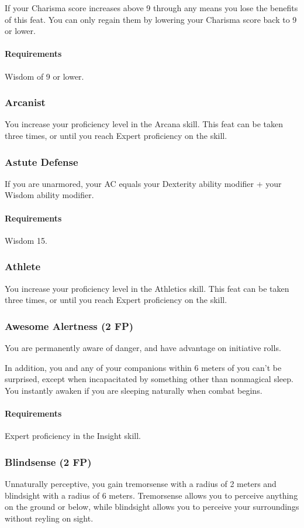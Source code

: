     If your Charisma score increases above 9 through any means you lose the benefits of this feat.
    You can only regain them by lowering your Charisma score back to 9 or lower.
    \paragraph{Requirements} Wisdom of 9 or lower.
\subsubsection{Arcanist} \label{feat::arcanist}
    You increase your proficiency level in the Arcana skill.
    This feat can be taken three times, or until you reach Expert proficiency on the skill.
\subsubsection{Astute Defense} \label{feat::astutedefense}
    If you are unarmored, your AC equals your Dexterity ability modifier + your Wisdom ability modifier.
    \paragraph{Requirements} Wisdom 15.
\subsubsection{Athlete} \label{feat::athlete}
    You increase your proficiency level in the Athletics skill.
    This feat can be taken three times, or until you reach Expert proficiency on the skill.
\subsubsection{Awesome Alertness (2 FP)} \label{feat::awesomealertness}
    You are permanently aware of danger, and have advantage on initiative rolls.

    In addition, you and any of your companions within 6 meters of you can't be surprised, except when incapacitated by something other than nonmagical sleep.
    You instantly awaken if you are sleeping naturally when combat begins.
    \paragraph{Requirements} Expert proficiency in the Insight skill.
\subsubsection{Blindsense (2 FP)} \label{feat::blindsense}
    Unnaturally perceptive, you gain tremorsense with a radius of 2 meters and blindsight with a radius of 6 meters.
    Tremorsense allows you to perceive anything on the ground or below, while blindsight allows you to perceive your surroundings without reyling on sight.
